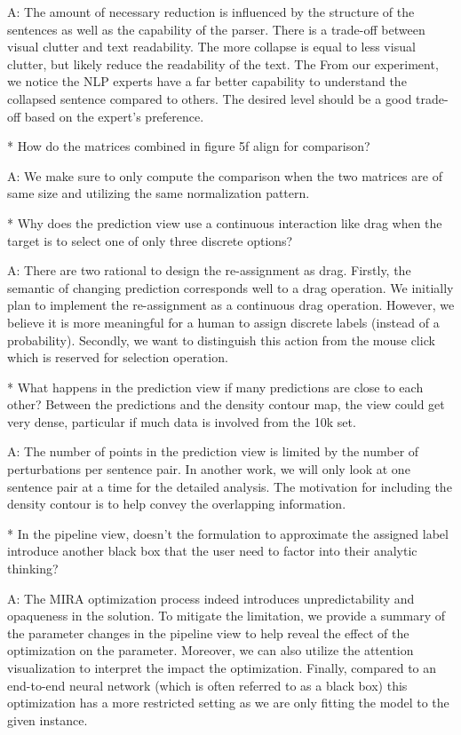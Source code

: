 A: The amount of necessary reduction is influenced by the structure of the sentences as well as the capability of the parser. There is a trade-off between visual clutter and text readability. The more collapse is equal to less visual clutter, but likely reduce the readability of the text. The From our experiment, we notice the NLP experts have a far better capability to understand the collapsed sentence compared to others. The desired level should be a good trade-off based on the expert's preference.

* How do the matrices combined in figure 5f align for comparison?

A: We make sure to only compute the comparison when the two matrices are of same size and utilizing the same normalization pattern.

* Why does the prediction view use a continuous interaction like drag when the target is to select one of only three discrete options?

A: There are two rational to design the re-assignment as drag. Firstly, the semantic of changing prediction corresponds well to a drag operation. We initially plan to implement the re-assignment as a continuous drag operation. However, we believe it is more meaningful for a human to assign discrete labels (instead of a probability). Secondly, we want to distinguish this action from the mouse click which is reserved for selection operation.

* What happens in the prediction view if many predictions are close to each other? Between the predictions and the density contour map, the view could get very dense, particular if much data is involved from the 10k set.

A: The number of points in the prediction view is limited by the number of perturbations per sentence pair. In another work, we will only look at one sentence pair at a time for the detailed analysis. The motivation for including the density contour is to help convey the overlapping information.

* In the pipeline view, doesn't the formulation to approximate the assigned label introduce another black box that the user need to factor into their analytic thinking?

A: The MIRA optimization process indeed introduces unpredictability and opaqueness in the solution. To mitigate the limitation, we provide a summary of the parameter changes in the pipeline view to help reveal the effect of the optimization on the parameter. Moreover, we can also utilize the attention visualization to interpret the impact the optimization. Finally, compared to an end-to-end neural network (which is often referred to as a black box) this optimization has a more restricted setting as we are only fitting the model to the given instance.


